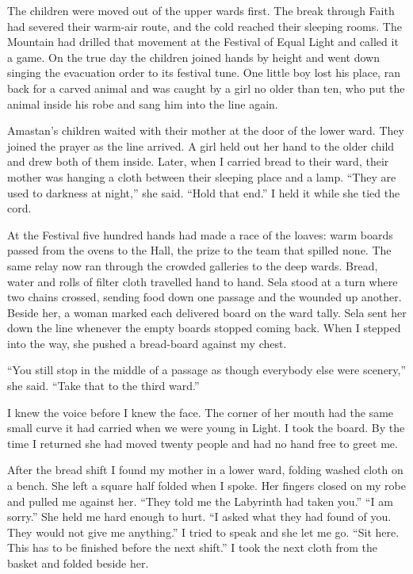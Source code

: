 The children were moved out of the upper wards first. The break through Faith had severed their warm-air route, and the cold reached their sleeping rooms. The Mountain had drilled that movement at the Festival of Equal Light and called it a game. On the true day the children joined hands by height and went down singing the evacuation order to its festival tune. One little boy lost his place, ran back for a carved animal and was caught by a girl no older than ten, who put the animal inside his robe and sang him into the line again.\par

Amastan's children waited with their mother at the door of the lower ward. They joined the prayer as the line arrived. A girl held out her hand to the older child and drew both of them inside. Later, when I carried bread to their ward, their mother was hanging a cloth between their sleeping place and a lamp. ``They are used to darkness at night,'' she said. ``Hold that end.'' I held it while she tied the cord.\par

At the Festival five hundred hands had made a race of the loaves: warm boards passed from the ovens to the Hall, the prize to the team that spilled none. The same relay now ran through the crowded galleries to the deep wards. Bread, water and rolls of filter cloth travelled hand to hand. Sela stood at a turn where two chains crossed, sending food down one passage and the wounded up another. Beside her, a woman marked each delivered board on the ward tally. Sela sent her down the line whenever the empty boards stopped coming back. When I stepped into the way, she pushed a bread-board against my chest.\par

``You still stop in the middle of a passage as though everybody else were scenery,'' she said. ``Take that to the third ward.''\par

I knew the voice before I knew the face. The corner of her mouth had the same small curve it had carried when we were young in Light. I took the board. By the time I returned she had moved twenty people and had no hand free to greet me.\par

After the bread shift I found my mother in a lower ward, folding washed cloth on a bench. She left a square half folded when I spoke. Her fingers closed on my robe and pulled me against her. ``They told me the Labyrinth had taken you.'' ``I am sorry.'' She held me hard enough to hurt. ``I asked what they had found of you. They would not give me anything.'' I tried to speak and she let me go. ``Sit here. This has to be finished before the next shift.'' I took the next cloth from the basket and folded beside her.\par

